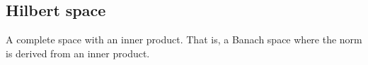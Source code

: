 
\subsection{Hilbert space}

A complete space with an inner product. That is, a Banach space where the norm is derived from an inner product.

